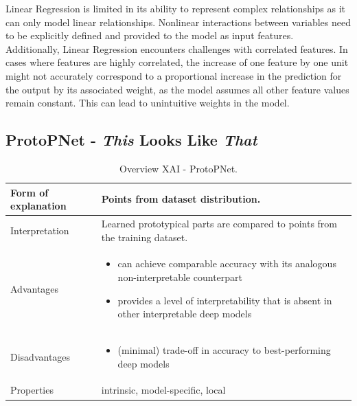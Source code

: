Linear Regression is limited in its ability to represent complex relationships as it can only model linear relationships. Nonlinear interactions between variables need to be explicitly defined and provided to the model as input features. \\
Additionally, Linear Regression encounters challenges with correlated features. In cases where features are highly correlated, the increase of one feature by one unit might not accurately correspond to a proportional increase in the prediction for the output by its associated weight, as the model assumes all other feature values remain constant. This can lead to unintuitive weights in the model.\cite{molnar2022}

\subsection{ProtoPNet - \textit{This} Looks Like \textit{That}}\label{sec:ProtoPNet}

\begin{table}[H]
  \centering
  \begin{tabular}{|p{}|p{}|}
    \hline
    Form of \newline explanation & Points from dataset distribution.
    \\
    
    \hline
    Interpretation & Learned prototypical parts are compared to points from the training dataset.
     \\
 
    \hline
    Advantages &
    \begin{itemize}[nosep, left=0em]
        \item can achieve comparable accuracy with its analogous non-interpretable counterpart
        \item provides a level of interpretability that is absent in other interpretable deep models    
    \end{itemize} \\
    
    \hline
    Disadvantages &
    \begin{itemize}[nosep, left=0em]
        \item (minimal) trade-off in accuracy to best-performing deep models
    \end{itemize} \\
    
    \hline
    Properties & intrinsic, model-specific, local
      \\
    
    \hline
  \end{tabular}
  \caption[Overview XAI - ProtoPNet]{Overview XAI - ProtoPNet.\cite{NEURIPS2019_adf7ee2d}}
  \label{tab:XAIProtoPNet}
\end{table}

